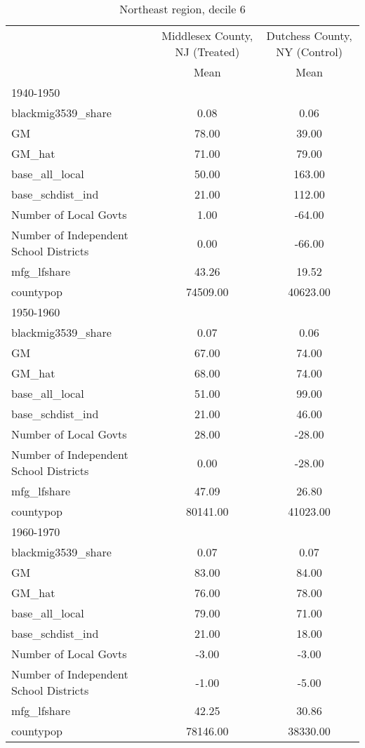 \begin{table}[htbp]\centering
\def\sym#1{\ifmmode^{#1}\else\(^{#1}\)\fi}
\caption{Northeast region, decile 6 \label{tab1}}
\begin{tabular}{l*{2}{c}}
\toprule
                    &\multicolumn{1}{c}{Middlesex County, NJ (Treated)}&\multicolumn{1}{c}{Dutchess County, NY (Control)}\\
                    &        Mean&        Mean\\
\midrule
1940-1950           &            &            \\
blackmig3539\_share  &        0.08&        0.06\\
GM                  &       78.00&       39.00\\
GM\_hat              &       71.00&       79.00\\
base\_all\_local      &       50.00&      163.00\\
base\_schdist\_ind    &       21.00&      112.00\\
Number of Local Govts&        1.00&      -64.00\\
Number of Independent School Districts&        0.00&      -66.00\\
mfg\_lfshare         &       43.26&       19.52\\
countypop           &    74509.00&    40623.00\\
\midrule
1950-1960           &            &            \\
blackmig3539\_share  &        0.07&        0.06\\
GM                  &       67.00&       74.00\\
GM\_hat              &       68.00&       74.00\\
base\_all\_local      &       51.00&       99.00\\
base\_schdist\_ind    &       21.00&       46.00\\
Number of Local Govts&       28.00&      -28.00\\
Number of Independent School Districts&        0.00&      -28.00\\
mfg\_lfshare         &       47.09&       26.80\\
countypop           &    80141.00&    41023.00\\
\midrule
1960-1970           &            &            \\
blackmig3539\_share  &        0.07&        0.07\\
GM                  &       83.00&       84.00\\
GM\_hat              &       76.00&       78.00\\
base\_all\_local      &       79.00&       71.00\\
base\_schdist\_ind    &       21.00&       18.00\\
Number of Local Govts&       -3.00&       -3.00\\
Number of Independent School Districts&       -1.00&       -5.00\\
mfg\_lfshare         &       42.25&       30.86\\
countypop           &    78146.00&    38330.00\\
\bottomrule
\end{tabular}
\end{table}
